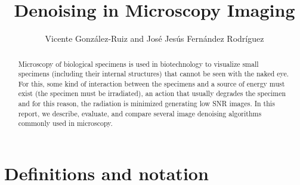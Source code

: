\documentclass{article}
\title{Denoising in Microscopy Imaging}
\author{Vicente González-Ruiz and José Jesús Fernández Rodríguez}
\begin{document}
\maketitle

\begin{abstract}

  Microscopy of biological specimens is used in biotechnology to
  visualize small specimens (including their internal structures) that
  cannot be seen with the naked eye. For this, some kind of
  interaction between the specimens and a source of energy must exist
  (the specimen must be irradiated), an action that usually degrades
  the specimen and for this reason, the radiation is minimized
  generating low SNR images. In this report, we describe, evaluate,
  and compare several image denoising algorithms commonly used in
  microscopy.

\end{abstract}

\section*{Definitions and notation}
\end{document}
